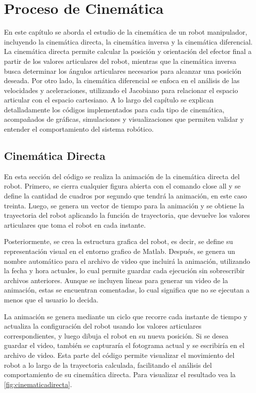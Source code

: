 \section{Proceso de Cinemática} \label{sec:proceso_cinematica}

En este capítulo se aborda el estudio de la cinemática de un robot manipulador, incluyendo la cinemática directa, la cinemática inversa y la cinemática diferencial. La cinemática directa permite calcular la posición y orientación del efector final a partir de los valores articulares del robot, mientras que la cinemática inversa busca determinar los ángulos articulares necesarios para alcanzar una posición deseada. Por otro lado, la cinemática diferencial se enfoca en el análisis de las velocidades y aceleraciones, utilizando el Jacobiano para relacionar el espacio articular con el espacio cartesiano. A lo largo del capítulo se explican detalladamente los códigos implementados para cada tipo de cinemática, acompañados de gráficas, simulaciones y visualizaciones que permiten validar y entender el comportamiento del sistema robótico.


\subsection{Cinemática Directa}

En esta sección del código se realiza la animación de la cinemática directa del robot. Primero, se cierra cualquier figura abierta con el comando close all y se define la cantidad de cuadros por segundo que tendrá la animación, en este caso treinta. Luego, se genera un vector de tiempo para la animación y se obtiene la trayectoria del robot aplicando la función de trayectoria, que devuelve los valores articulares que toma el robot en cada instante. 

Posteriormente, se crea la estructura grafica del robot, es decir, se define su representación visual en el entorno grafico de Matlab. Después, se genera un nombre automático para el archivo de video que incluirá la animación, utilizando la fecha y hora actuales, lo cual permite guardar cada ejecución sin sobrescribir archivos anteriores. Aunque se incluyen líneas para generar un video de la animación, estas se encuentran comentadas, lo cual significa que no se ejecutan a menos que el usuario lo decida. 

La animación se genera mediante un ciclo que recorre cada instante de tiempo y actualiza la configuración del robot usando los valores articulares correspondientes, y luego dibuja el robot en su nueva posición. Si se desea guardar el video, también se capturaría el fotograma actual y se escribiría en el archivo de video. Esta parte del código permite visualizar el movimiento del robot a lo largo de la trayectoria calculada, facilitando el análisis del comportamiento de su cinemática directa. Para visualizar el resultado vea la \autoref{fig:cinematicadirecta}.

